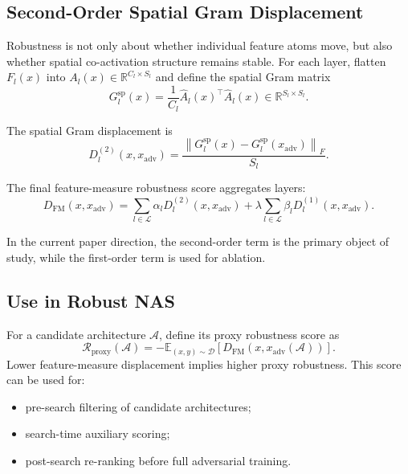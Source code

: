 \documentclass[10pt,twocolumn]{article}
\newcommand{\xadv}{x_{\mathrm{adv}}}
\newcommand{\xadvA}{x_{\mathrm{adv}}(\mathcal{A})}
\newcommand{\R}{\mathbb{R}}
\newcommand{\E}{\mathbb{E}}
\newcommand{\FM}{D_{\mathrm{FM}}}
\begin{document}
\subsection{Second-Order Spatial Gram Displacement}

Robustness is not only about whether individual feature atoms move, but also whether spatial co-activation structure remains stable.
For each layer, flatten $F_l(x)$ into $A_l(x) \in \R^{C_l \times S_l}$ and define the spatial Gram matrix
\begin{equation}
  G_l^{\mathrm{sp}}(x)
  =
  \frac{1}{C_l}
  \hat{A}_l(x)^\top \hat{A}_l(x)
  \in \R^{S_l \times S_l}.
\end{equation}

The spatial Gram displacement is
\begin{equation}
  D_l^{(2)}(x,\xadv)
  =
  \frac{
  \left\|
  G_l^{\mathrm{sp}}(x) - G_l^{\mathrm{sp}}(\xadv)
  \right\|_F
  }{
  S_l
  }.
\end{equation}

The final feature-measure robustness score aggregates layers:
\begin{equation}
  \FM(x,\xadv)
  =
  \sum_{l \in \mathcal{L}}
  \alpha_l
  D_l^{(2)}(x,\xadv)
  +
  \lambda
  \sum_{l \in \mathcal{L}}
  \beta_l
  D_l^{(1)}(x,\xadv).
\end{equation}

In the current paper direction, the second-order term is the primary object of study, while the first-order term is used for ablation.

\subsection{Use in Robust NAS}

For a candidate architecture $\mathcal{A}$, define its proxy robustness score as
\begin{equation}
  \mathcal{R}_{\mathrm{proxy}}(\mathcal{A})
  =
  - \E_{(x,y)\sim \mathcal{D}}
  \left[
  \FM(x, \xadvA)
  \right].
\end{equation}
Lower feature-measure displacement implies higher proxy robustness.
This score can be used for:
\begin{itemize}
  \item pre-search filtering of candidate architectures;
  \item search-time auxiliary scoring;
  \item post-search re-ranking before full adversarial training.
\end{itemize}
\end{document}
